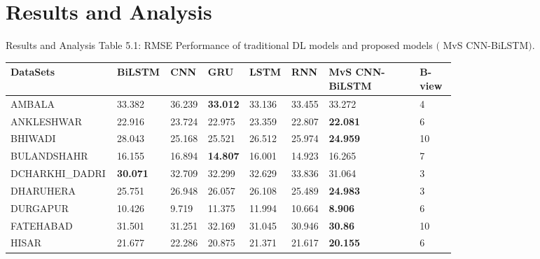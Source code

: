 \documentclass[12pt, aspectratio=169]{beamer}
\begin{document}
\section[Results and Analysis]{Results and Analysis}
\begin{frame}{Results and Analysis}
	\centering
	\scriptsize {Table 5.1: RMSE Performance of traditional DL models and proposed models $($ MvS CNN-BiLSTM$)$.}\\
	\begin{table}
		\begin{tabular}[c]{|p{0.165\linewidth}|p{0.096\linewidth}|p{0.044\linewidth}|p{0.044\linewidth}|p{0.06\linewidth}|p{0.044\linewidth}|p{0.206\linewidth}|p{0.08\linewidth}|} \hline
		\footnotesize \textbf{DataSets} &\footnotesize  \textbf{ BiLSTM } &\footnotesize  \textbf{CNN} &\footnotesize  \textbf{GRU} &\footnotesize  \textbf{LSTM } &\footnotesize  \textbf{RNN} & \footnotesize  \textbf{MvS CNN-BiLSTM } & \footnotesize  \textbf{B-view} \\ \hline
		AMBALA         & 33.382          & 36.239    & \textbf{33.012} & 33.136     & 33.455                & 33.272          & 4      \\ \hline
		ANKLESHWAR     & 22.916          & 23.724    & 22.975          & 23.359     & 22.807                & \textbf{22.081} & 6      \\ \hline
		BHIWADI        & 28.043          & 25.168    & 25.521          & 26.512     & 25.974                & \textbf{24.959} & 10     \\ \hline
		BULANDSHAHR    & 16.155          & 16.894    & \textbf{14.807} & 16.001     & 14.923                & 16.265          & 7      \\ \hline
		 DCHARKHI\_DADRI & \textbf{30.071} & 32.709    & 32.299          & 32.629     & 33.836              & 31.064          & 3      \\ \hline
		 DHARUHERA      & 25.751          & 26.948    & 26.057          & 26.108     & 25.489           &\textbf{24.983}          & 3      \\ \hline
		 DURGAPUR       & 10.426          & 9.719     & 11.375          & 11.994     & 10.664                    & \textbf{8.906}  & 6      \\ \hline
		 FATEHABAD      & 31.501          & 31.251    & 32.169          & 31.045     & 30.946                    & \textbf{30.86}  & 10     \\ \hline
		 HISAR          & 21.677          & 22.286    & 20.875          & 21.371     & 21.617                 & \textbf{20.155} & 6      \\ \hline

\end{tabular}
\end{table}
\end{frame}
\end{document}
